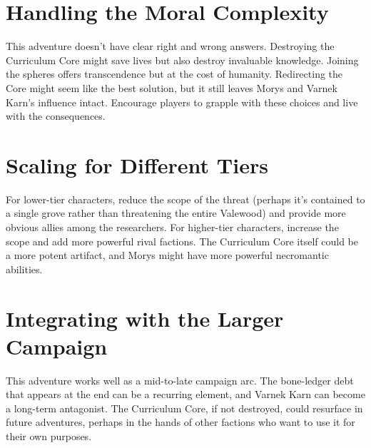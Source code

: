 \documentclass[11pt,twoside]{book}
\begin{document}
\section*{Handling the Moral Complexity}

This adventure doesn't have clear right and wrong answers. Destroying the Curriculum Core might save lives but also destroy invaluable knowledge. Joining the spheres offers transcendence but at the cost of humanity. Redirecting the Core might seem like the best solution, but it still leaves Morys and Varnek Karn's influence intact. Encourage players to grapple with these choices and live with the consequences.

\section*{Scaling for Different Tiers}

For lower-tier characters, reduce the scope of the threat (perhaps it's contained to a single grove rather than threatening the entire Valewood) and provide more obvious allies among the researchers. For higher-tier characters, increase the scope and add more powerful rival factions. The Curriculum Core itself could be a more potent artifact, and Morys might have more powerful necromantic abilities.

\section*{Integrating with the Larger Campaign}

This adventure works well as a mid-to-late campaign arc. The bone-ledger debt that appears at the end can be a recurring element, and Varnek Karn can become a long-term antagonist. The Curriculum Core, if not destroyed, could resurface in future adventures, perhaps in the hands of other factions who want to use it for their own purposes.
\end{document}
